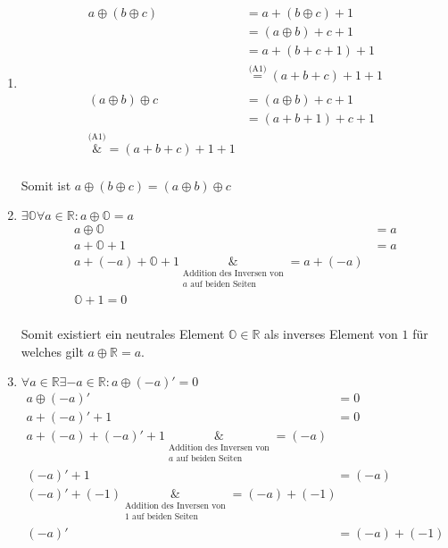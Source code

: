 \documentclass{article}
\begin{document}
\begin{enumerate}[label=(A\arabic*)]
\item
  \begin{align*}
    a \oplus (b \oplus c) &= a + (b \oplus c) + 1 \\
                          &= (a \oplus b) + c + 1 \\
                          &= a + (b + c + 1) + 1 \\
                          &\overset{\text{(A1)}}= (a + b + c) + 1 + 1 \\
    \\
    (a \oplus b) \oplus c &= (a \oplus b) + c + 1 \\
                          &= (a + b + 1) + c + 1 \\
    \overset{\text{(A1)}}&{=} (a + b + c) + 1 + 1 \\
  \end{align*}

  Somit ist $a \oplus (b \oplus c) = (a \oplus b) \oplus c$

\item $\exists \mathbb{O} \forall a \in \mathbb{R} \colon a \oplus \mathbb{O} = a$
  \begin{align*}
    a \oplus \mathbb{O} &= a \\
    a + \mathbb{O} + 1 &= a\\
    a + (-a) + \mathbb{O} + 1 \underset{\substack{\text{Addition des Inversen von} \\ a \text{ auf beiden Seiten}}}&{=} a + (-a) \\
    \mathbb{O} + 1 = 0 \\
  \end{align*}

  Somit existiert ein neutrales Element $\mathbb{O} \in \mathbb{R}$ als inverses Element von $1$ für welches gilt
  $a \oplus \mathbb{R} = a$.

\item $\forall a \in \mathbb{R} \exists -a \in \mathbb{R} \colon a \oplus (-a)' = 0$ \\

  \begin{align*}
    a \oplus (-a)' &= 0 \\
    a + (-a)' + 1 &= 0 \\ 
    a + (-a) + (-a)' + 1 \underset{\substack{\text{Addition des Inversen von} \\ a \text{ auf beiden Seiten}}}&{=} (-a)\\
    (-a)' + 1 &= (-a) \\
    (-a)' + (-1) \underset{\substack{\text{Addition des Inversen von} \\ 1 \text{ auf beiden Seiten}}}&{=} (-a) + (-1)\\
    (-a)' &= (-a) + (-1) \\
  \end{align*}


\end{enumerate}
\end{document}
